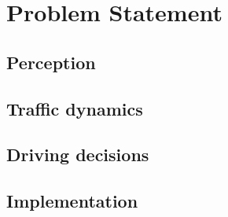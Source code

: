 
\graphicspath{{2-Chapters/3-Chapter/}}

\chapter{Problem Statement}
\label{chapter:3}

\section{Perception}
\section{Traffic dynamics}
\section{Driving decisions}
\section{Implementation}